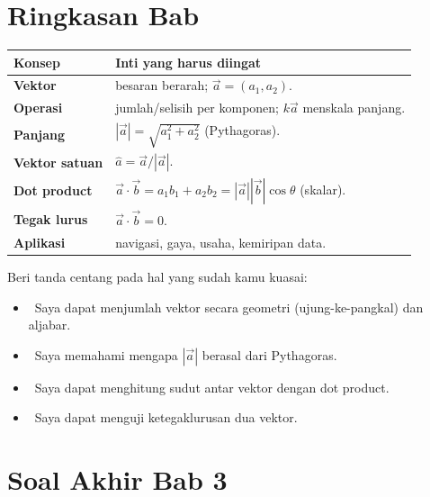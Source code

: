 \documentclass[11pt,a4paper]{report}
\theoremstyle{gaya}
\newcommand{\cek}{\ding{113}\ } %
\begin{document}
\section*{Ringkasan Bab}
\begin{center}
\begin{tabular}{>{\bfseries}p{3.5cm} p{10.2cm}}
\toprule
Konsep & Inti yang harus diingat \\
\midrule
Vektor & besaran berarah; $\vec a=(a_1,a_2)$. \\
Operasi & jumlah/selisih per komponen; $k\vec a$ menskala panjang. \\
Panjang & $|\vec a|=\sqrt{a_1^2+a_2^2}$ (Pythagoras). \\
Vektor satuan & $\hat a=\vec a/|\vec a|$. \\
Dot product & $\vec a\cdot\vec b=a_1b_1+a_2b_2=|\vec a||\vec b|\cos\theta$ (skalar). \\
Tegak lurus & $\vec a\cdot\vec b=0$. \\
Aplikasi & navigasi, gaya, usaha, kemiripan data. \\
\bottomrule
\end{tabular}
\end{center}

\begin{refleksi}
Beri tanda centang pada hal yang sudah kamu kuasai:
\begin{itemize}[leftmargin=*,label={},topsep=2pt]
  \item \cek Saya dapat menjumlah vektor secara geometri (ujung-ke-pangkal) dan aljabar.
  \item \cek Saya memahami mengapa $|\vec a|$ berasal dari Pythagoras.
  \item \cek Saya dapat menghitung sudut antar vektor dengan dot product.
  \item \cek Saya dapat menguji ketegaklurusan dua vektor.
\end{itemize}
\end{refleksi}

\section*{Soal Akhir Bab 3}
\end{document}

